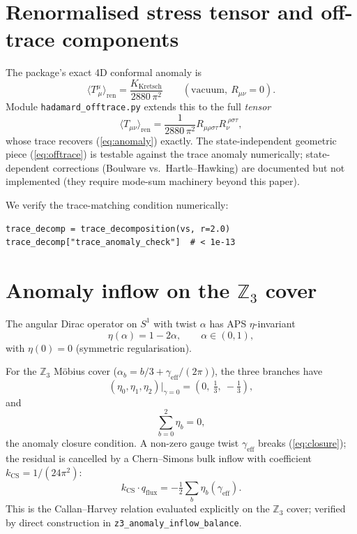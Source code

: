 \documentclass[11pt,a4paper]{article}
\begin{document}
\section{Renormalised stress tensor and off-trace components}

The package's exact 4D conformal anomaly is
\begin{equation}
\langle T^\mu_{\ \mu} \rangle_{\text{ren}}
  = \frac{K_{\text{Kretsch}}}{2880\, \pi^2}
  \qquad (\text{vacuum},\ R_{\mu\nu} = 0).
\label{eq:anomaly}
\end{equation}
Module \texttt{hadamard\_offtrace.py} extends this to the full
\emph{tensor}
\begin{equation}
\langle T_{\mu\nu} \rangle_{\text{ren}}
  = \frac{1}{2880\, \pi^2}
    R_{\mu\rho\sigma\tau} R_\nu^{\ \rho\sigma\tau},
\label{eq:offtrace}
\end{equation}
whose trace recovers (\ref{eq:anomaly}) exactly. The
state-independent geometric piece (\ref{eq:offtrace}) is testable
against the trace anomaly numerically; state-dependent corrections
(Boulware vs.\ Hartle--Hawking) are documented but not implemented
(they require mode-sum machinery beyond this paper).

We verify the trace-matching condition numerically:
\begin{verbatim}
trace_decomp = trace_decomposition(vs, r=2.0)
trace_decomp["trace_anomaly_check"]  # < 1e-13
\end{verbatim}

\section{Anomaly inflow on the $\mathbb{Z}_3$ cover}

The angular Dirac operator on $S^1$ with twist $\alpha$ has
APS $\eta$-invariant
\begin{equation}
\eta(\alpha) = 1 - 2\alpha,\qquad \alpha \in (0, 1),
\end{equation}
with $\eta(0) = 0$ (symmetric regularisation).

For the $\mathbb{Z}_3$ M\"obius cover ($\alpha_b = b/3 +
\gamma_{\text{eff}}/(2\pi)$), the three branches have
\begin{equation}
(\eta_0, \eta_1, \eta_2)\big|_{\gamma=0} = (0,\ \tfrac{1}{3},\ -\tfrac{1}{3}),
\end{equation}
and
\begin{equation}
\sum_{b=0}^{2} \eta_b = 0,
\label{eq:closure}
\end{equation}
the anomaly closure condition. A non-zero gauge twist
$\gamma_{\text{eff}}$ breaks (\ref{eq:closure}); the residual is
cancelled by a Chern--Simons bulk inflow with coefficient
$k_{\text{CS}} = 1 / (24 \pi^2)$:
\begin{equation}
k_{\text{CS}} \cdot q_{\text{flux}}
  = -\tfrac{1}{2} \sum_b \eta_b(\gamma_{\text{eff}}).
\end{equation}
This is the Callan--Harvey relation evaluated explicitly on the
$\mathbb{Z}_3$ cover; verified by direct construction in
\texttt{z3\_anomaly\_inflow\_balance}.
\end{document}
